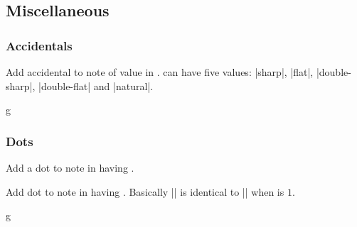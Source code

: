 \subsection{Miscellaneous}\label{sec:music-notes:misc}
\subsubsection{Accidentals}\label{sec:music-notes:misc:accidentals}
\begin{command}{\tmappendaccidental{}}
  Add accidental  to note of value  in 
  .  can have five values: |sharp|, |flat|, 
  |double-sharp|, |double-flat| and |natural|.
\end{command}
\begin{codeexample}[]
\begin{tmline}%
\begin{tmstaff}{g}{}
\end{tmstaff}%
\end{tmline}
\end{codeexample}
\subsubsection{Dots}\label{sec:music-notes:misc:dots}
\begin{command}{\tmadddot{}}
  Add a dot to note in  having .
\end{command}
\begin{command}{\tmadddot*{}}
  Add  dot to note in  having 
  . Basically |\tmadddot| is identical to |\tmadddot*| when 
   is $1$.
\end{command}
\begin{codeexample}[]
\begin{tmline}%
\begin{tmstaff}{g}{}
\end{tmstaff}%
\end{tmline}
\end{codeexample}
